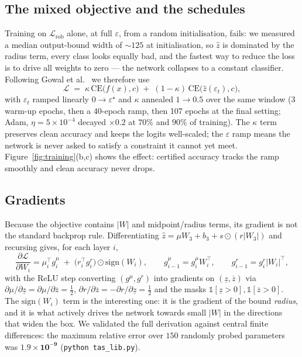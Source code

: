 \documentclass[11pt,a4paper]{article}
\newcommand{\eps}{\varepsilon}
\newcommand{\lb}[1]{\underline{#1}}
\newcommand{\ub}[1]{\overline{#1}}
\begin{document}
\subsection{The mixed objective and the schedules}
\label{sec:sched}
Training on $\mathcal{L}_{\mathrm{rob}}$ alone, at full $\eps$, from a random
initialisation, fails: we measured a median output-bound width of $\sim\!125$ at
initialisation, so $\hat z$ is dominated by the radius term, every class looks
equally bad, and the fastest way to reduce the loss is to drive all weights to
zero --- the network collapses to a constant classifier. Following Gowal
et al.~\cite{gowal2018} we therefore use
\begin{equation}
\mathcal{L} \;=\; \kappa\,\mathrm{CE}\bigl(f(x),c\bigr) \;+\; (1-\kappa)\,\mathrm{CE}\bigl(\hat z(\eps_t),c\bigr),
\end{equation}
with $\eps_t$ ramped linearly $0\to\eps^\star$ and $\kappa$ annealed $1\to0.5$
over the same window (3 warm-up epochs, then a 40-epoch ramp, then 107 epochs at
the final setting; Adam, $\eta=5\times10^{-4}$ decayed $\times0.2$ at $70\%$ and
$90\%$ of training). The $\kappa$ term preserves clean accuracy and keeps the
logits well-scaled; the $\eps$ ramp means the network is never asked to satisfy
a constraint it cannot yet meet. Figure~\ref{fig:training}(b,c) shows the effect:
certified accuracy tracks the ramp smoothly and clean accuracy never drops.

\subsection{Gradients}
Because the objective contains $|W|$ and midpoint/radius terms, its gradient is
not the standard backprop rule. Differentiating $\hat z = \mu W_3+b_3+s\odot(r|W_3|)$
and recursing gives, for each layer $i$,
\begin{equation}
\frac{\partial \mathcal{L}}{\partial W_i} = \mu_{i}^{\!\top} g^{\mu}_i \;+\; \bigl(r_{i}^{\!\top} g^{r}_i\bigr)\odot\mathrm{sign}(W_i),
\qquad
g^{\mu}_{i-1} = g^{\mu}_i W_i^{\!\top},\qquad
g^{r}_{i-1} = g^{r}_i |W_i|^{\!\top},
\end{equation}
with the ReLU step converting $(g^{\mu},g^{r})$ into gradients on $(\lb{z},\ub{z}
)$ via $\partial\mu/\partial\lb{z}=\partial\mu/\partial\ub{z}=\tfrac12$,
$\partial r/\partial\ub{z}=-\partial r/\partial\lb{z}=\tfrac12$ and the masks
$\mathbb{1}[\lb{z}>0],\mathbb{1}[\ub{z}>0]$. The $\mathrm{sign}(W_i)$ term is the
interesting one: it is the gradient of the bound \emph{radius}, and it is what
actively drives the network towards small $|W|$ in the directions that widen the
box. We validated the full derivation against central finite differences: the
maximum relative error over $150$ randomly probed parameters was
$\mathbf{1.9\times10^{-9}}$ (\texttt{python tas\_lib.py}).
\end{document}

